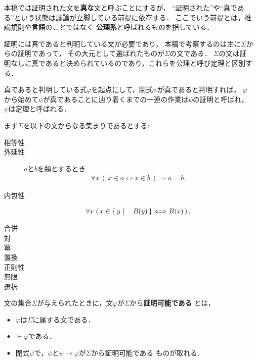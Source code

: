 	本稿では証明された文を{\bf 真な}文と呼ぶことにするが，
	``証明された''や``真である''という状態は議論が立脚している前提に依存する．
	ここでいう前提とは，推論規則や言語のことではなく
	{\bf 公理系}と呼ばれるものを指している．
	
	証明には真であると判明している文が必要であり，
	本稿で考察するのは主に$\Sigma$からの証明であって，
	その大元として選ばれたものが$\Sigma$の文である．
	$\Sigma$の文は証明なしに真であると決められているのであり，これらを公理と呼び定理と区別する．
	
	真であると判明している式$\varphi$を起点にして，閉式$\psi$が真であると判明すれば，
	$\varphi$から始めて$\psi$が真であることに辿り着くまでの一連の作業は$\psi$の証明と呼ばれ，
	$\psi$は定理と呼ばれる．
	
	まず$\Sigma$を以下の文からなる集まりであるとする:
	\begin{description}
		\item[相等性]
		\item[外延性] $a$と$b$を類とするとき
			\begin{align}
				\forall x\, (\, x \in a \Longleftrightarrow x \in b\, )
				\Longrightarrow a = b.
			\end{align}
			
		\item[内包性] 
			\begin{align}
				\forall x\, \left(\, x \in \left\{\, y \mid \quad B(y)\, \right\} \Longleftrightarrow B(x)\, \right).
			\end{align}
			
		\item[合併]
		\item[対]
		\item[冪]
		\item[置換]
		\item[正則性]
		\item[無限]
		\item[選択]
	\end{description}
	
	文の集合$\Sigma$が与えられたときに，文$\varphi$が$\Sigma$から{\bf 証明可能である}
	とは，
	\begin{itemize}
		\item $\varphi$は$\Sigma$に属する文である．
		\item $\vdash \varphi$である．
		\item 閉式$\psi$で，$\psi$と$\psi \rightarrow \varphi$が$\Sigma$から証明可能である
			ものが取れる．
	\end{itemize}
	
